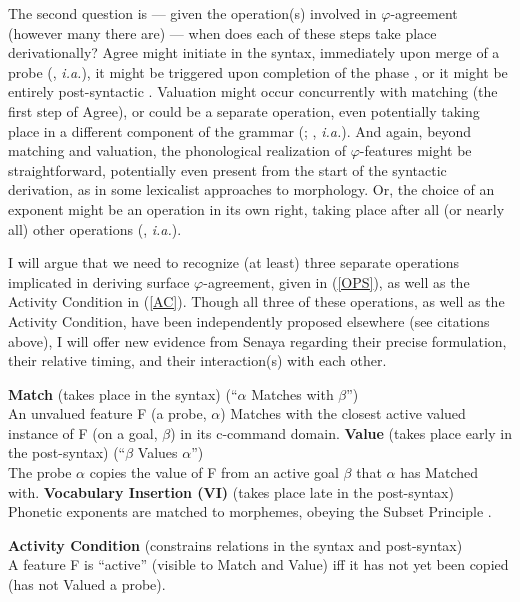 \documentclass[output=paper
,modfonts
,nonflat]{langsci/langscibook}
\begin{document}
The second question is --- given the operation(s) involved in $\varphi$-agreement (however many there are) --- when does each of these steps take place derivationally? Agree might initiate in the syntax, immediately upon merge of a probe ({\citealt{Bejar03,Preminger11,Preminger14}, \textit{i.a.}}), it might be triggered upon completion of the phase \citep{Chomsky08}, or it might be entirely post-syntactic \citep{Bobaljik08}. Valuation might occur concurrently with matching (the first step of Agree), or could be a separate operation, even potentially taking place in a different component of the grammar (\citealt{vanKoppen07,BBP09,ArregiNevins12,BhattWalkow13,Bonet13,Marusicetal15,Smith17,AtlamazBakerTA}; , \textit{i.a.}). And again, beyond matching and valuation, the phonological realization of $\varphi$-features  might be straightforward, potentially even present from the start of the syntactic derivation, as in some lexicalist approaches to morphology. Or, the choice of an exponent might be an operation in its own right,  taking place after all (or nearly all) other operations  (\citealt{HalleMarantz93,HalleMarantz94,EmbickNoyer07}, \textit{i.a.}). 

I will argue that we need to recognize (at least) three separate operations implicated in deriving surface $\varphi$-agreement, given in (\ref{OPS}), as well as the Activity Condition in (\ref{AC}). Though all three of these operations, as well as the Activity Condition, have been independently proposed elsewhere (see citations above), I will offer new evidence from Senaya regarding their precise formulation, their relative timing, and their interaction(s) with each other.

\eal \label{OPS}
\ex \textbf{Match} {(takes place in the syntax)} \- \hfill (``{$\alpha$} Matches with {$\beta$}'')\\
An unvalued feature F (a probe, {$\alpha$}) Matches with the closest active valued instance of F (on a goal, {$\beta$}) in its c-command domain.
\ex \textbf{Value} (takes place early in the post-syntax) \- \hfill (``{$\beta$} Values {$\alpha$}'')\\
The probe {$\alpha$} copies the value of F from an active goal {$\beta$} that {$\alpha$} has Matched with.
\ex \textbf{Vocabulary Insertion (VI)} (takes place late in the post-syntax)\\
Phonetic exponents are matched to morphemes, obeying the Subset Principle \citep{Halle97}.
\zl

\ea \textbf{Activity Condition} (constrains relations in the syntax and post-syntax)\\A feature F is ``active'' (visible to Match and Value) iff it has not yet been copied (has not Valued a probe).\label{AC}
\z
\end{document}
